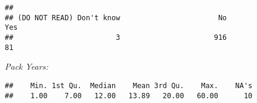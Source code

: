 \documentclass[
]{article}
\newenvironment{Shaded}{\begin{snugshade}}{\end{snugshade}}
\newcommand{\CommentTok}[1]{\textcolor[rgb]{0.56,0.35,0.01}{\textit{#1}}}
\newcommand{\FunctionTok}[1]{\textcolor[rgb]{0.00,0.00,0.00}{#1}}
\newcommand{\NormalTok}[1]{#1}
\newcommand{\SpecialCharTok}[1]{\textcolor[rgb]{0.00,0.00,0.00}{#1}}
\begin{document}
\begin{verbatim}
## 
## (DO NOT READ) Don't know                       No                      Yes 
##                        3                      916                       81
\end{verbatim}

\emph{Pack Years:}

\begin{Shaded}
\end{Shaded}

\begin{verbatim}
##    Min. 1st Qu.  Median    Mean 3rd Qu.    Max.    NA's 
##    1.00    7.00   12.00   13.89   20.00   60.00      10
\end{verbatim}
\end{document}
